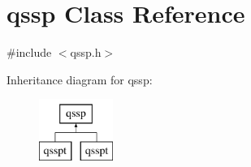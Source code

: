 \hypertarget{classqssp}{\section{qssp Class Reference}
\label{classqssp}
}


{\ttfamily \#include $<$qssp.\-h$>$}

Inheritance diagram for qssp\-:\begin{figure}[H]
\begin{center}
\leavevmode
\includegraphics[height=2.000000cm]{classqssp}
\end{center}
\end{figure}
